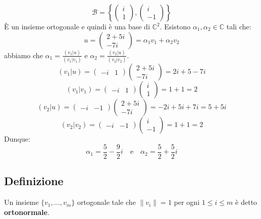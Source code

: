 \documentclass[a4paper]{article}
\theoremstyle{break}
\theoremstyle{break}
\theoremstyle{break}
\theoremstyle{break}
\begin{document}
\begin{example}
  \[
  \mathcal{B} = \left\{ 
    \begin{pmatrix} 
      i\\1
    \end{pmatrix} ,
    \begin{pmatrix} 
      i\\-1
    \end{pmatrix} 
  \right\} 
  \] 
  È un insieme ortogonale e quindi è una base di \( \mathbb{C}^2 \).
  Esistono \( \alpha_1, \alpha_2 \in \mathbb{C} \) tali che:
  \[
  u = \begin{pmatrix} 
    2+5i\\
    -7i
  \end{pmatrix} 
  =
  \alpha_1 v_1 + \alpha_2 v_2
  \] 
  abbiamo che \( \alpha_1 = \frac{(v_1|u)}{(v_1|v_1)} \) e \( \alpha_2 = \frac{(v_2|u)}{(v_2|v_2)} \).
  \[
    (v_1|u) = \begin{pmatrix} -i & 1 \end{pmatrix} 
    \begin{pmatrix} 
      2 + 5i\\
      -7i
    \end{pmatrix} 
    =
    2i+5 - 7i
  \] 
  \[
    (v_1|v_1) = \begin{pmatrix} -i & 1 \end{pmatrix}
    \begin{pmatrix} 
      i\\1
    \end{pmatrix}
    = 1 + 1 = 2
  \] 
  \[
    (v_2|u) = \begin{pmatrix} -i & -1 \end{pmatrix}
    \begin{pmatrix} 
      2 + 5i\\
      -7i
    \end{pmatrix}
    = -2i + 5i + 7i = 5 + 5i
  \] 
  \[
    (v_2|v_2) = \begin{pmatrix} -i & -1 \end{pmatrix}
    \begin{pmatrix} 
      i\\-1
    \end{pmatrix}
    = 1 + 1 = 2
  \] 
  Dunque:
  \[
  \alpha_1 = \frac{5}{2} - \frac{9}{2}i \quad \text{e} \quad \alpha_2 = \frac{5}{2} + \frac{5}{2}i
  \] 
\end{example}

\subsection{Definizione}
Un insieme \( \{v_1, \ldots, v_m\} \) ortogonale tale che \( \|v_i\| = 1 \) per ogni
\( 1 \le i \le m \) è detto \textbf{ortonormale}.
\end{document}
